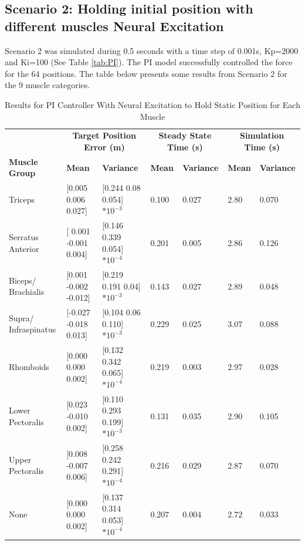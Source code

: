 \subsection{Scenario 2: Holding initial position with different muscles Neural Excitation}
Scenario 2 was simulated during 0.5 seconds with a time step of 0.001s, Kp=2000 and Ki=100 (See Table \ref{tab:PI}).
The PI model successfully controlled the force for the 64 positions. The table below presents some results from Scenario 2 for the 9 muscle categories.
\begin{table}[h]
    \centering
    \tiny %
    \caption{Results for PI Controller With Neural Excitation to Hold Static Position for Each Muscle}
    \begin{tabularx}{\linewidth}{|l|X|X|X|X|X|X|}
        \hline
        & \multicolumn{2}{c|}{\textbf{Target Position Error (m)}} & \multicolumn{2}{c|}{\textbf{Steady State Time (s)}} & \multicolumn{2}{c|}{\textbf{Simulation Time (s)}} \\
        \cline{2-7}
        \textbf{Muscle Group} & \textbf{Mean} & \textbf{Variance} & \textbf{Mean} & \textbf{Variance} & \textbf{Mean} & \textbf{Variance} \\
        \hline
        Triceps & [0.005 0.006 0.027] & [0.244 0.08 0.054]$*10^{-3}$ &  0.100 & 0.027 & 2.80 & 0.070 \\
        \hline
        Serratus Anterior & [ 0.001 -0.001 0.004] & [0.146 0.339 0.054]$*10^{-4}$ &  0.201 & 0.005 & 2.86 & 0.126 \\
        \hline
        Biceps/ Brachialis & [0.001 -0.002 -0.012] & [0.219 0.191 0.04]$*10^{-3}$ &  0.143 & 0.027 & 2.89 & 0.048 \\
        \hline
        Supra/ Infraspinatus & [-0.027 -0.018 0.013] & [0.104 0.06 0.110]$*10^{-3}$ & 0.229 & 0.025  & 3.07 & 0.088 \\
        \hline
        Rhomboids & [0.000 0.000 0.002] & [0.132 0.342 0.065]$*10^{-4}$ &   0.219 & 0.003 & 2.97 & 0.028 \\
        \hline
        Lower Pectoralis & [0.023 -0.010 0.002] & [0.110 0.293 0.199]$*10^{-3}$ &  0.131 & 0.035 & 2.90 & 0.105 \\
        \hline
        Upper Pectoralis & [0.008 -0.007 0.006] & [0.258 0.242 0.291]$*10^{-4}$ &   0.216 & 0.029 & 2.87 & 0.070 \\
        \hline
        None & [0.000 0.000 0.002] & [0.137 0.314 0.053]$*10^{-4}$ &  0.207 & 0.004 & 2.72 & 0.033 \\
        \hline
    \end{tabularx}
    \label{table:PIResults}
\end{table}


